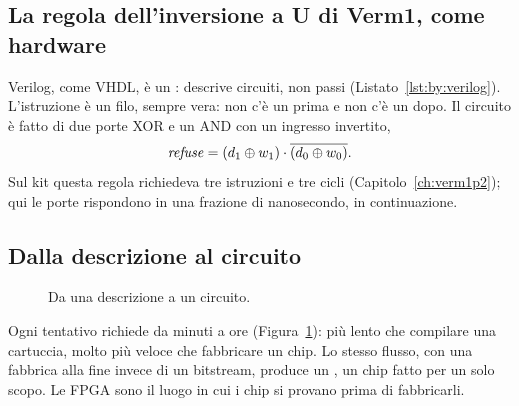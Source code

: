 \subsection{La regola dell'inversione a U di Verm1, come hardware}



Verilog, come VHDL, è un :
descrive circuiti, non passi (Listato~\ref{lst:by:verilog}). L'istruzione
 è un filo, sempre vera: non c'è un prima e non c'è un dopo. Il
circuito è fatto di due porte XOR e un AND con un ingresso invertito,
\[ \mathit{refuse}=(d_1\oplus w_1)\cdot\overline{(d_0\oplus w_0)} . \]
Sul kit questa regola richiedeva tre istruzioni e tre cicli
(Capitolo~\ref{ch:verm1p2}); qui le porte rispondono in una frazione di
nanosecondo, in continuazione.

\subsection{Dalla descrizione al circuito}

\begin{figure}[htb]
\centering
{}
\caption{Da una descrizione a un circuito.}
\label{fig:by:fpgaflow}
\end{figure}

Ogni tentativo richiede da minuti a ore (Figura~\ref{fig:by:fpgaflow}): più
lento che compilare una cartuccia, molto più veloce che fabbricare un chip. Lo
stesso flusso, con una fabbrica alla fine invece di un bitstream, produce un
, un chip fatto per un solo scopo. Le FPGA sono il luogo in cui i
chip si provano prima di fabbricarli.

